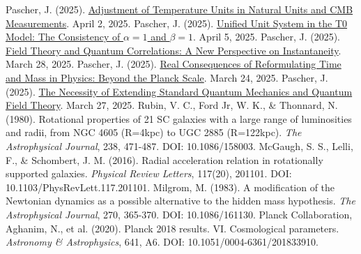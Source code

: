 \documentclass[12pt,a4paper]{article}
\begin{document}
\begin{thebibliography}{99}
		 Pascher, J. (2025). \href{https://github.com/jpascher/T0-Time-Mass-Duality/tree/main/2/pdf/English/Anpassung\%20von\%20Temperatureinheiten\%20in\%20natürlichen\%20Einheiten\%20und\%20CMB-Messungen_en.pdf}{Adjustment of Temperature Units in Natural Units and CMB Measurements}. April 2, 2025.
		 Pascher, J. (2025). \href{https://github.com/jpascher/T0-Time-Mass-Duality/tree/main/2/pdf/English/Die\%20Konsistenz\%20von\%20alpha\%20=\%201\%20und\%20beta\%20=\%201_en.pdf}{Unified Unit System in the T0 Model: The Consistency of \(\alpha = 1\) and \(\beta = 1\)}. April 5, 2025.
		 Pascher, J. (2025). \href{https://github.com/jpascher/T0-Time-Mass-Duality/tree/main/2/pdf/English/Feldtheorie\%20und\%20Quantenkorrelationen_en.pdf}{Field Theory and Quantum Correlations: A New Perspective on Instantaneity}. March 28, 2025.
		 Pascher, J. (2025). \href{https://github.com/jpascher/T0-Time-Mass-Duality/tree/main/2/pdf/English/Jenseits\%20der\%20Planck-Skala_en.pdf}{Real Consequences of Reformulating Time and Mass in Physics: Beyond the Planck Scale}. March 24, 2025.
		 Pascher, J. (2025). \href{https://github.com/jpascher/T0-Time-Mass-Duality/tree/main/2/pdf/English/Die\%20Notwendigkeit\%20einer\%20Erweiterung\%20der\%20Standard-Quantenmechanik\%20und\%20Quantenfeldtheorie_en.pdf}{The Necessity of Extending Standard Quantum Mechanics and Quantum Field Theory}. March 27, 2025.
		 Rubin, V. C., Ford Jr, W. K., \& Thonnard, N. (1980). Rotational properties of 21 SC galaxies with a large range of luminosities and radii, from NGC 4605 (R=4kpc) to UGC 2885 (R=122kpc). \textit{The Astrophysical Journal}, 238, 471-487. DOI: 10.1086/158003.
		 McGaugh, S. S., Lelli, F., \& Schombert, J. M. (2016). Radial acceleration relation in rotationally supported galaxies. \textit{Physical Review Letters}, 117(20), 201101. DOI: 10.1103/PhysRevLett.117.201101.
		 Milgrom, M. (1983). A modification of the Newtonian dynamics as a possible alternative to the hidden mass hypothesis. \textit{The Astrophysical Journal}, 270, 365-370. DOI: 10.1086/161130.
		 Planck Collaboration, Aghanim, N., et al. (2020). Planck 2018 results. VI. Cosmological parameters. \textit{Astronomy \& Astrophysics}, 641, A6. DOI: 10.1051/0004-6361/201833910.
	\end{thebibliography}
	
\end{document}
